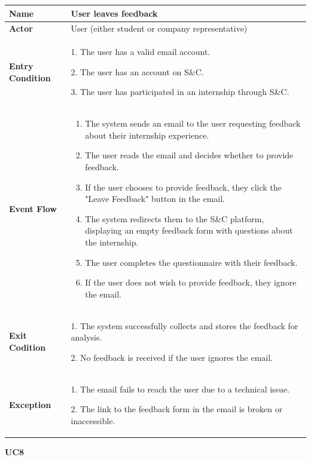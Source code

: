 \begin{longtable}{|p{}|p{}|}
\hline
\textbf{Name} &  User leaves feedback\\
\hline
\textbf{Actor} &  User (either student or company representative)\\
\hline
\textbf{Entry Condition} &  
1. The user has a valid email account.

2. The user has an account on S\&C.

3. The user has participated in an internship through S\&C.\\
\hline
\textbf{Event Flow} &  
\begin{enumerate}
    \item The system sends an email to the user requesting feedback about their internship experience.
    \item The user reads the email and decides whether to provide feedback.
    \item If the user chooses to provide feedback, they click the "Leave Feedback" button in the email.
    \item The system redirects them to the S\&C platform, displaying an empty feedback form with questions about the internship.	
    \item The user completes the questionnaire with their feedback.
    \item  If the user does not wish to provide feedback, they ignore the email.
\end{enumerate}\\
\hline
\textbf{Exit Codition} & 
1. The system successfully collects and stores the feedback for analysis.

2. No feedback is received if the user ignores the email.\\
\hline
\textbf{Exception} &  
1. The email fails to reach the user due to a technical issue.	

2. The link to the feedback form in the email is broken or inaccessible.\\
\hline
\end{longtable}

\textbf{UC8}

